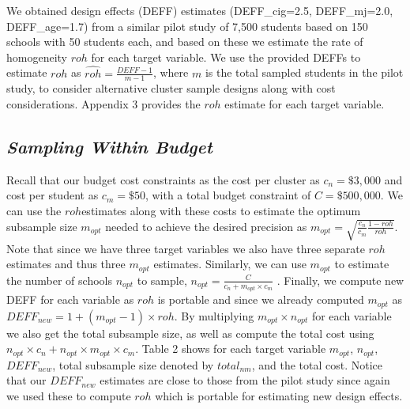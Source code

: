 \documentclass[
  12pt]{article}
\begin{document}
We obtained design effects (DEFF) estimates (DEFF\_cig=2.5,
DEFF\_mj=2.0, DEFF\_age=1.7) from a similar pilot study of 7,500
students based on 150 schools with 50 students each, and based on these
we estimate the rate of homogeneity \(roh\) for each target variable. We
use the provided DEFFs to estimate \(roh\) as
\(\hat{roh} = \frac{DEFF-1}{m-1}\), where \(m\) is the total sampled
students in the pilot study, to consider alternative cluster sample
designs along with cost considerations. Appendix 3 provides the \(roh\)
estimate for each target variable.

\subsection{\texorpdfstring{\emph{Sampling Within
Budget}}{Sampling Within Budget}}\label{sampling-within-budget}

Recall that our budget cost constraints as the cost per cluster as
\(c_n = \$3,000\) and cost per student as \(c_m = \$50\), with a total
budget constraint of \(C = \$500,000\). We can use the \(roh\)estimates
along with these costs to estimate the optimum subsample size
\(m_{opt}\) needed to achieve the desired precision as
\(m_{opt} = \sqrt{\frac{c_n}{c_m} \frac{1-roh}{roh}}\). Note that since
we have three target variables we also have three separate \(roh\)
estimates and thus three \(m_{opt}\) estimates. Similarly, we can use
\(m_{opt}\) to estimate the number of schools \(n_{opt}\) to sample,
\(n_{opt} = \frac{C}{c_n + m_{opt} \times c_m}\) . Finally, we compute
new DEFF for each variable as \(roh\) is portable and since we already
computed \(m_{opt}\) as \(DEFF_{new} = 1 + (m_{opt} - 1) \times roh\).
By multiplying \(m_{opt} \times n_{opt}\) for each variable we also get
the total subsample size, as well as compute the total cost using
\(n_{opt} \times c_n + n_{opt} \times m_{opt} \times c_m\). Table 2
shows for each target variable \(m_{opt}\), \(n_{opt}\), \(DEFF_{new}\),
total subsample size denoted by \(total_{nm}\), and the total cost.
Notice that our \(DEFF_{new}\) estimates are close to those from the
pilot study since again we used these to compute \(roh\) which is
portable for estimating new design effects.
\end{document}
